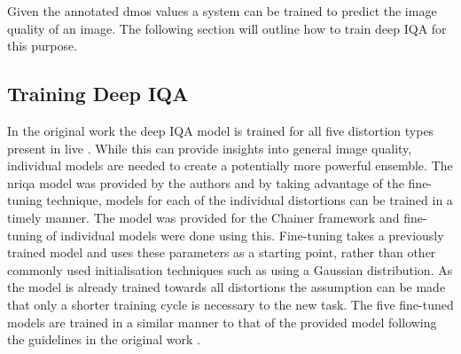 \documentclass[a4paper,twoside]{article}
\begin{document}
Given the annotated \gls{dmos} values a system can be trained to predict the image quality of an image. The following section will outline how to train deep IQA for this purpose.

\subsection{Training Deep IQA}
In the original work the deep IQA model \cite{deepiqa} is trained for all five distortion types present in \gls{live} \cite{livepaper} \cite{liveweb}. While this can provide insights into general image quality, individual models are needed to create a potentially more powerful ensemble. The \gls{nriqa} model was provided by the authors and by taking advantage of the fine-tuning technique, models for each of the individual distortions can be trained in a timely manner. The model was provided for the Chainer framework \cite{chainer} and fine-tuning of individual models were done using this. Fine-tuning takes a previously trained model and uses these parameters as a starting point, rather than other commonly used initialisation techniques such as using a Gaussian distribution. As the model is already trained towards all distortions the assumption can be made that only a shorter training cycle is necessary to the new task. The five fine-tuned models are trained in a similar manner to that of the provided model following the guidelines in the original work \cite{deepiqa}. 
\\\\
\end{document}
